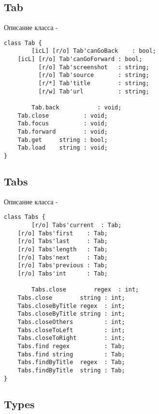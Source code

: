 \subsection{{\color{orange} Tab}}

\noindent Описание класса  -
\begin{lstlisting}[numbers=none]
class Tab {
        [icL] [r/o] Tab'canGoBack    : bool;
	[icL] [r/o] Tab'canGoForward : bool;
	      [r/o] Tab'screenshot   : string;
	      [r/o] Tab'source       : string;
	      [r/*] Tab'title        : string;
	      [r/w] Tab'url          : string;

        Tab.back           : void;
	Tab.close          : void;
	Tab.focus          : void;
	Tab.forward        : void;
	Tab.get     string : bool;
	Tab.load    string : void;
}
\end{lstlisting}

\subsection{{\color{orange} Tabs}}

\noindent Описание класса  -
\begin{lstlisting}[numbers=none]
class Tabs {
        [r/o] Tabs'current  : Tab;
	[r/o] Tabs'first    : Tab;
	[r/o] Tabs'last     : Tab;
	[r/o] Tabs'length   : Tab;
	[r/o] Tabs'next     : Tab;
	[r/o] Tabs'previous : Tab;
	[r/o] Tabs'int      : Tab;
	
        Tabs.close        regex  : int;
	Tabs.close        string : int;
	Tabs.closeByTitle regex  : int;
	Tabs.closeByTitle string : int;
	Tabs.closeOthers         : int;
	Tabs.closeToLeft         : int;
	Tabs.closeToRight        : int;
	Tabs.find regex          : Tab;
	Tabs.find string         : Tab;
	Tabs.findByTitle  regex  : Tab;
	Tabs.findByTitle  string : Tab;
}
\end{lstlisting}

\subsection{{\color{orange} Types}}

